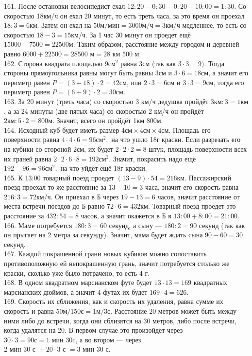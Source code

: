 \documentclass[12pt]{article}
\begin{document}
161. После остановки велосипедист ехал $12:20-0:30-0:20-10:00=1:30.$ Со скоростью 18км/ч он ехал 20 минут, то есть треть часа, за это время он проехал $18:3=6$км. Затем он ехал на $50\text{м/мин}=3000\text{м/ч}=3$км/ч медленнее, то есть со скоростью $18-3=15$км/ч. За 1 час 30 минут он проедет ещё $15000+7500=22500$м. Таким образом, расстояние между городом и деревней равно $6000+22500=28500\text{ м}=28\text{ км }500\text{ м.}$\\
162. Сторона квадрата площадью $9\text{см}^2$ равна 3см (так как $3\cdot3=9).$ Тогда стороны прямоугольника равны могут быть равны 3см и $3\cdot6=18$см, а значит его периметр равен $P=(3+18)\cdot2=42$см, или $2\cdot3=6$см и $3\cdot3=9$см, тогда его периметр равен $P=(6+9)\cdot2=30$см.\\
163. За 20 минут (треть часа) со скоростью 3 км/ч дедушка пройдёт $3\text{км}:3=1\text{км}$, а за 24 минуты (две пятых часа) со скоростью 2 км/ч он пройдёт $2\text{км}:5\cdot2=800$м. Значит, всего он пройдёт 1км 800м.\\
164. Исходный куб будет иметь размер $4\text{см}\times4\text{см}\times4\text{см}.$ Площадь его поверхности равна $4\cdot4\cdot6=96\text{см}^2,$ на что ушло 18г краски. Если разрезать его на кубики со стороной 2см, их будет $2\cdot2\cdot2=8$ штук, площадь поверхности всех их граней равна $2\cdot2\cdot6\cdot8=192\text{см}^2.$ Значит, покрасить надо ещё $192-96=96\text{см}^2,$ на что уйдёт ещё 18г краски.\\
165. К 13:00 товарный поезд проедет $(13-9)\cdot54=216$км. Пассажирский поезд проехал то же расстояние за $13-10=3$ часа, значит его скорость равна $216:3=72$км/ч. Он приехал в Б через $19-13=6$ часов, значит расстояние от места встречи поездов до Б равно $72\cdot6=432$км. Товарный поезд проедет это расстояние за $432:54=8$ часов, а значит окажется в Б в $13:00+8:00=21:00.$\\
166. Маме потребуется $180:3=60$ секунд, а сыну --- $180:2=90$ секунд (так как он прыгает на 2 метра за секунду). Значит, мама будет ждать сына $90-60=30$ секунд.\\
167. Каждой покрашенной грани новых кубиков можно сопоставить противоположную ей непокрашенную грань, значит потребуется столько же краски, сколько уже было потрачено, то есть 4 г.\\
168. В одном квадратном марсианском футе будет $13\cdot13=169$ квадратных марсианских дюймов, а значит 4 футах их будет $169\cdot4=626.$\\
169. Скорость их сближения, как и скорость их удаления, равна сумме их скорость и равна $50\text{м}/150\text{с}=1\text{м}/3\text{с}.$ Расстояние 20 метров может быть между ними либо до встречи, когда они сблизятся на 30 метров, либо после встречи, когда удалятся на 20. В первом случае это произойдёт через $30\cdot3=90\text{с}=1\text{ мин }30$c, а во втором --- через $2\text{ мин }30\text{ с }+20\cdot3\text{ с }=3\text{ мин }30\text{ с.}$\\
\end{document}
